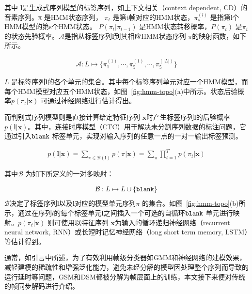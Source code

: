 其中 $\mathbf{l}$是生成式序列模型的标签序列，如上下文相关（context dependent, CD）的音素序列。π 是HMM状态序列， $\pi_t$ 是第t帧对应的HMM状态，$\pi_s^{(l)}$ 是指第l个HMM模型的第s个HMM状态。 $P(\pi_t|\pi_{t-1})$  是HMM状态转移概率，$P(\pi_t)$  是$\pi_t$的状态先验概率。$\mathcal{A}$是指从标签序列$\mathbf{l}$到其相应HMM状态序列 $\pi$的映射函数，如下所示。

\begin{equation}
\label{equ:a-func}
\begin{split}
\mathcal{A}:{L}  \mapsto \{ \pi_1^{(1)},\cdots,\pi_5^{(1)},\cdots,\pi_5^{(|{L}|)} \}
\end{split}
\end{equation}

${L}$ 是标签序列$\mathbf{l}$的各个单元的集合。其中每个标签序列单元对应一个HMM模型，而每个HMM模型对应五个HMM状态，如图~\ref{fig:hmm-topo}(a)中所示。状态后验概率$p(\pi_t|\mathbf{x})$ 可通过神经网络进行估计得出。

而判别式序列模型则是直接计算给定特征序列 $\mathbf{x}$时产生标签序列$\mathbf{l}$的后验概率$p(\mathbf{l}|\mathbf{x})$。其中，连接时序模型（CTC）用于解决未分割序列数据的标注问题，它通过引入$\tt blank$ 标签单元，实现对输入序列的任意一点的一对一输出标签预测。


\begin{equation}
\label{equ:psd-ctc-model}
\begin{split}
p(\mathbf{l}|\mathbf{x})=\sum_{\pi\in\mathcal{B}(\mathbf{l})}p(\pi|\mathbf{x}) =\sum_{\pi}\prod_{t=1}^{T} p(\pi_t|\mathbf{x})
\end{split}
\end{equation}

其中$\mathcal{B}$ 为如下所定义的一对多映射：

\begin{equation}
\label{equ:psd-ctc-b}
\begin{split}
\mathcal{B}:{L}   \mapsto  {L} \cup \{{\tt blank}\}
\end{split}
\end{equation}
$\mathcal{B}$决定了标签序列l以及$\mathbf{l}$对应的模型单元序列$\pi$ 的集合。如图~\ref{fig:hmm-topo}(b)所示，通过在序列$l$的每个标签单元$\mathbf{l}$之间插入一个可选的自循环$ \tt blank$ 单元进行映射。$p(\pi_t|\mathbf{x})$  则可使用以特征序列 $\mathbf{x}$为输入的循环递归神经网络（recurrent neural network, RNN）或长短时记忆神经网络（long short term memory, LSTM）\cite{hochreiter1997long}等估计得到。

通常，如引言中所述，为了有效利用帧级分类器如GMM\cite{woodland1994large}和神经网络\cite{hinton2012deep}的建模效果，减轻建模的稀疏性和增强泛化能力，避免未经分解的模型因处理整个序列而导致的运行延时等问题，GSM和DSM都被分解为帧层面上的训练，本文接下来便对传统的帧同步解码进行介绍。


